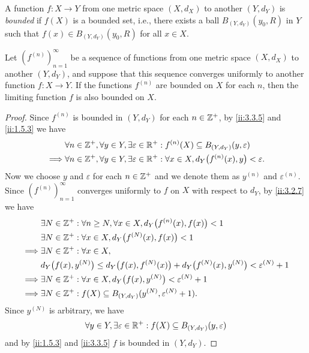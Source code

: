 \begin{defn}\label{ii:3.3.5}
  A function \(f : X \to Y\) from one metric space \((X, d_X)\) to another \((Y, d_Y)\) is \emph{bounded} if \(f(X)\) is a bounded set, i.e., there exists a ball \(B_{(Y, d_Y)}(y_0, R)\) in \(Y\) such that \(f(x) \in B_{(Y, d_Y)}(y_0, R)\) for all \(x \in X\).
\end{defn}

\begin{prop}\label{ii:3.3.6}
  Let \((f^{(n)})_{n = 1}^\infty\) be a sequence of functions from one metric space \((X, d_X)\) to another \((Y, d_Y)\), and suppose that this sequence converges uniformly to another function \(f : X \to Y\).
  If the functions \(f^{(n)}\) are bounded on \(X\) for each \(n\), then the limiting function \(f\) is also bounded on \(X\).
\end{prop}

\begin{proof}
  Since \(f^{(n)}\) is bounded in \((Y, d_Y)\) for each \(n \in \mathbb{Z}^+\), by \cref{ii:3.3.5} and \cref{ii:1.5.3} we have
  \begin{align*}
             & \forall n \in \mathbb{Z}^+, \forall y \in Y, \exists \varepsilon \in \mathbb{R}^+ : f^{(n)}(X) \subseteq B_{(Y, d_Y)}(y, \varepsilon)          \\
    \implies & \forall n \in \mathbb{Z}^+, \forall y \in Y, \exists \varepsilon \in \mathbb{R}^+ : \forall x \in X, d_Y\big(f^{(n)}(x), y\big) < \varepsilon.
  \end{align*}
  Now we choose \(y\) and \(\varepsilon\) for each \(n \in \mathbb{Z}^+\) and we denote them as \(y^{(n)}\) and \(\varepsilon^{(n)}\).
  Since \((f^{(n)})_{n = 1}^\infty\) converges uniformly to \(f\) on \(X\) with respect to \(d_Y\), by \cref{ii:3.2.7} we have
  \begin{align*}
             & \exists N \in \mathbb{Z}^+ : \forall n \geq N, \forall x \in X, d_Y\big(f^{(n)}(x), f(x)\big) < 1                                \\
             & \exists N \in \mathbb{Z}^+ : \forall x \in X, d_Y\big(f^{(N)}(x), f(x)\big) < 1                                                  \\
    \implies & \exists N \in \mathbb{Z}^+ : \forall x \in X,                                                                                    \\
             & d_Y\big(f(x), y^{(N)}\big) \leq d_Y\big(f(x), f^{(N)}(x)\big) + d_Y\big(f^{(N)}(x), y^{(N)}\big) < \varepsilon^{(N)} + 1 \\
    \implies & \exists N \in \mathbb{Z}^+ : \forall x \in X, d_Y\big(f(x), y^{(N)}\big) < \varepsilon^{(N)} + 1                                 \\
    \implies & \exists N \in \mathbb{Z}^+ : f(X) \subseteq B_{(Y, d_Y)}(y^{(N)}, \varepsilon^{(N)} + 1).
  \end{align*}
  Since \(y^{(N)}\) is arbitrary, we have
  \[
    \forall y \in Y, \exists \varepsilon \in \mathbb{R}^+ : f(X) \subseteq B_{(Y, d_Y)}(y, \varepsilon)
  \]
  and by \cref{ii:1.5.3} and \cref{ii:3.3.5} \(f\) is bounded in \((Y, d_Y)\).
\end{proof}

